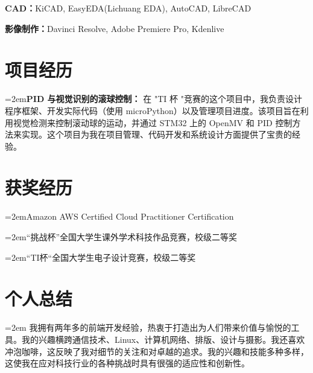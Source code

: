 \documentclass{article}
\newcommand{\cvsection}[1]{\section*{\rmfamily#1}}
\begin{document}
\begin{CJK}{UTF8}{gbsn}
\hspace{2em}\textbf{CAD：}KiCAD, EasyEDA(Lichuang EDA), AutoCAD, LibreCAD 

\hspace{2em}\textbf{影像制作：}Davinci Resolve, Adobe Premiere Pro, Kdenlive


\cvsection{项目经历}
\indent 

\hangindent=2em\textbf{PID 与视觉识别的滚球控制：} 在 "TI 杯 "竞赛的这个项目中，我负责设计程序框架、开发实际代码（使用 microPython）以及管理项目进度。该项目旨在利用视觉检测来控制滚动球的运动，并通过 STM32 上的 OpenMV 和 PID 控制方法来实现。这个项目为我在项目管理、代码开发和系统设计方面提供了宝贵的经验。


\cvsection{获奖经历}
\indent

\hangindent=2emAmazon AWS Certified Cloud Practitioner Certification

\hangindent=2em“挑战杯”全国大学生课外学术科技作品竞赛，校级二等奖

\hangindent=2em“TI杯“全国大学生电子设计竞赛，校级二等奖





\cvsection{个人总结}
\indent

\hangindent=2em 我拥有两年多的前端开发经验，热衷于打造出为人们带来价值与愉悦的工具。我的兴趣横跨通信技术、Linux、计算机网络、排版、设计与摄影。我还喜欢冲泡咖啡，这反映了我对细节的关注和对卓越的追求。我的兴趣和技能多种多样，这使我在应对科技行业的各种挑战时具有很强的适应性和创新性。

\end{CJK}
\end{document}
